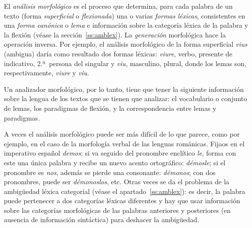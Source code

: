 El \emph{análisis morfológico} es el proceso que determina, para cada palabra de un texto (forma \emph{superficial} o \emph{flexionada}) una o varias \emph{formas léxicas}, consistentes en una \emph{forma canónica} o \emph{lema} e información sobre la categoría léxica de la palabra y la flexión (véase la sección~\ref{ss:amblex}). La {\em generación} morfológica hace la operación inversa. Por ejemplo, el análisis morfológico de la forma superficial \emph{vius} (ambigua) daría como resultado dos formas léxicas: \emph{viure}, verbo, presente de indicativo, 2.ª\ persona del singular y \emph{viu}, masculino, plural, donde los lemas son, respectivamente, \emph{viure} y \emph{viu}. 

Un analizador morfológico, por lo tanto, tiene que tener la siguiente información sobre la lengua de los textos que se tienen que analizar: el vocabulario o conjunto de lemas, los paradigmas de flexión, y la correspondencia entre lemas y paradigmas. 

A veces el análisis morfológico puede ser más difícil de lo que parece, como por ejemplo, en el caso de la morfología verbal de las lenguas románicas. Fijaos en el imperativo español \emph{demos}: si va seguido del pronombre enclítico \emph{le}, forma con este una única palabra y recibe un nuevo acento ortográfico: \emph{démosle}; si el pronombre es \emph{nos}, además se pierde una consonante: \emph{démonos}; con dos pronombres, puede ser {\em démonoslos}, etc. Otras veces se da el problema de la ambigüedad léxica categorial (véase el apartado~\ref{ss:amblex}): es decir, la palabra puede pertenecer a dos categorías léxicas diferentes y hay que usar información sobre las categorías morfológicas de las palabras anteriores y posteriores (en ausencia de información sintáctica) para deshacer la ambigüedad. 

